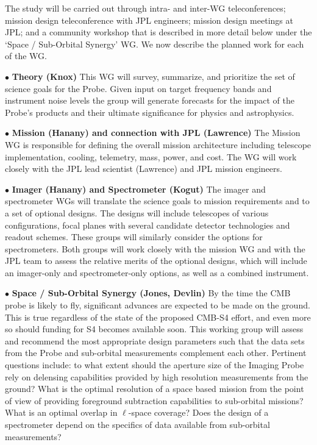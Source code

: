 The study will be carried out through intra- and inter-WG teleconferences; mission design teleconference with JPL engineers; 
mission design meetings at JPL; and a community workshop that is described in more detail below under the `Space / Sub-Orbital 
Synergy' WG. We now describe the planned work for each of the WG. 

$\bullet$ {\bf Theory (Knox)} \hspace{0.1in} This WG will survey, summarize, and prioritize the set of 
science goals for the Probe.  Given input on target frequency bands and instrument noise levels the group will 
generate forecasts for the impact of the Probe's products and their ultimate 
significance for physics and astrophysics.

$\bullet$ {\bf Mission (Hanany) and connection with JPL (Lawrence)} \hspace{0.1in} The Mission WG is responsible 
for defining the overall mission 
architecture including telescope implementation, cooling, telemetry, mass, power, and cost. The WG will work closely 
with the JPL lead scientist (Lawrence) and JPL mission engineers. 

$\bullet$ {\bf Imager (Hanany) and Spectrometer (Kogut)} \hspace{0.1in} The imager and spectrometer WGs will 
translate the science goals to 
mission requirements and to a set of optional designs. The designs will include telescopes of various configurations, 
focal planes with several candidate detector technologies and readout schemes. These groups will similarly consider 
the options for spectrometers.  Both groups will work closely 
with the mission WG and with the JPL team to assess the relative merits 
of the optional designs, which will include an imager-only and spectrometer-only options, as well as a combined
instrument.  

$\bullet$ {\bf Space / Sub-Orbital Synergy (Jones, Devlin)} \hspace{0.1in} By the time the \ac{CMB} probe is likely to fly,
significant advances are expected to be made on the ground. This is true regardless of the state of the proposed CMB-S4
effort, and even more so should funding for S4 becomes available soon. This working group will assess and recommend the 
most appropriate design parameters such that the data sets from the Probe and sub-orbital measurements complement each other. 
Pertinent questions include: to what extent should the aperture size of the Imaging Probe rely on delensing capabilities provided by 
high resolution measurements from the ground? What is the optimal resolution of a space based mission from the point 
of view of providing foreground subtraction capabilities to sub-orbital missions? What is an optimal overlap in $\ell$-space
coverage? Does the design of a spectrometer depend on the specifics of data available from sub-orbital measurements? 

